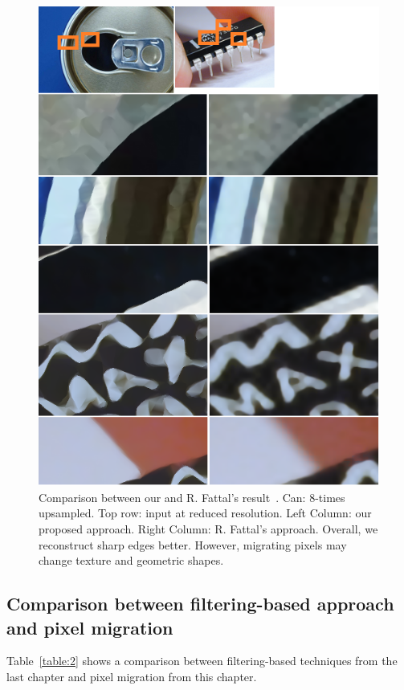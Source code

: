 \begin{figure}[htbp]\centering
\includegraphics{imagesPM/f10.png}
\caption{Comparison between our and R. Fattal's result~\cite{FAT:EdgeStatistics}. Can: 8-times upsampled. Top row: input at reduced resolution. Left Column: our proposed approach. Right Column: R. Fattal's approach. Overall, we reconstruct sharp edges better. However, migrating pixels may change texture and geometric shapes.}
\label{fig:compOursFattal}
\end{figure}


\subsection{Comparison between filtering-based approach and pixel migration}


Table~\ref{table:2} shows a comparison between filtering-based techniques from the last chapter and pixel migration from this chapter. 

